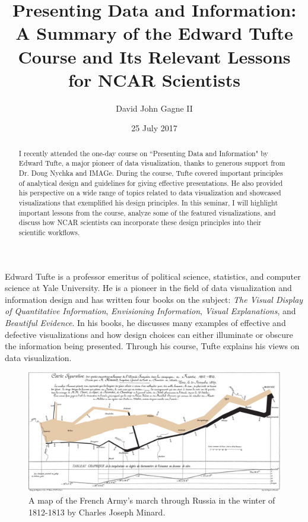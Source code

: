 \documentclass{tufte-handout}
\title{Presenting Data and Information: A Summary of the Edward Tufte Course and Its Relevant Lessons for NCAR Scientists}
\author[David John Gagne]{David John Gagne II}
\date{25 July 2017}  %
\begin{document}
\maketitle%

\begin{abstract}
\noindent I recently attended the one-day course on ``Presenting Data and Information" by Edward Tufte, a major pioneer of data visualization, thanks to generous support from Dr. Doug Nychka and IMAGe. During the course, Tufte covered important principles of analytical design and guidelines for giving effective presentations. He also provided his perspective on a wide range of topics related to data visualization and showcased visualizations that exemplified his design principles. In this seminar, I will highlight important lessons from the course, analyze some of the featured visualizations, and discuss how NCAR scientists can incorporate these design principles into their scientific workflows.
\end{abstract}

Edward Tufte is a professor emeritus of political science, statistics, and computer science at Yale University. He is a pioneer in the field of data visualization and information design and has written four books on the subject: \textit{The Visual Display of Quantitative Information}, \textit{Envisioning Information}, \textit{Visual Explanations}, and \textit{Beautiful Evidence}. In his books, he discusses many examples of effective and defective visualizations and how design choices can either illuminate or obscure the information being presented. Through his course, Tufte explains his views on data visualization.

\begin{figure}
\includegraphics[width=\textwidth]{Minard.png}
\caption{A map of the French Army's march through Russia in the winter of 1812-1813 by Charles Joseph Minard.}
\end{figure}
\end{document}
